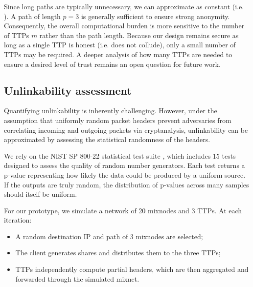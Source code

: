 Since long paths are typically unnecessary, we can approximate  as constant (i.e. ). 
A path of length $ p = 3 $ is generally sufficient to ensure strong anonymity. 
Consequently, the overall computational burden is more sensitive to the number of TTPs $ m $ rather than the path length. 
Because our design remains secure as long as a single TTP is honest (i.e. does not collude), only a small number of TTPs may be required. 
A deeper analysis of how many TTPs are needed to ensure a desired level of trust remains an open question for future work.


\subsection{Unlinkability assessment}

Quantifying unlinkability is inherently challenging. 
However, under the assumption that uniformly random packet headers prevent adversaries from correlating incoming and outgoing packets via cryptanalysis, 
unlinkability can be approximated by assessing the statistical randomness of the headers.

We rely on the NIST SP 800-22 statistical test suite \cite{NIST-SP80022}, which includes 15 tests designed to assess the quality of random number generators. 
Each test returns a p-value representing how likely the data could be produced by a uniform source. 
If the outputs are truly random, the distribution of p-values across many samples should itself be uniform.



For our prototype, we simulate a network of 20 mixnodes and 3 TTPs.\newline 
At each iteration:
\begin{itemize}
    \item A random destination IP and path of 3 mixnodes are selected;
    \item The client generates shares and distributes them to the three TTPs;
    \item TTPs independently compute partial headers, which are then aggregated and forwarded through the simulated mixnet.
\end{itemize}

